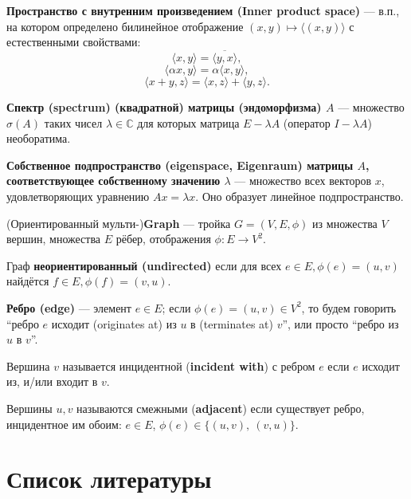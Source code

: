 \documentclass[14pt,a4paper]{extarticle}
\numberwithin{equation}{section}
\theoremstyle{definition}
\begin{document}
\textbf{Пространство с внутренним произведением (Inner product space)} --- в.п.,
на котором определено билинейное отображение \( (x,y) \mapsto \langle (x, y) \rangle\)
с естественными свойствами:
\[ \langle  x, y \rangle = \overline{\langle y, x \rangle}, \]
\[ \langle  \alpha x, y \rangle = \alpha \langle x, y \rangle, \]
\[ \langle  x + y, z \rangle =
  \langle x, z \rangle
  + \langle y, z \rangle.
\]

\textbf{Спектр (spectrum) (квадратной) матрицы (эндоморфизма) \( A \)} ---
множество \( \sigma(A) \) таких чисел \( \lambda\in\mathbb{C} \)
для которых матрица \( E - \lambda A \) (оператор \( I - \lambda A \))
необоратима.

\textbf{Собственное подпространство (eigenspace, Eigenraum)
  матрицы \( A \), соответствующее собственному значению \( \lambda \)}
--- множество всех векторов \( x \), удовлетворяющих уравнению \( Ax = \lambda
x\). Оно образует линейное подпространство.

(Ориентированный мульти-)\textbf{Graph} --- тройка \(G = (V, E, \phi)\)
из множества \( V \) вершин, множества \( E \) рёбер,
отображения \( \phi: E\to V^2\).

Граф \textbf{неориентированный (undirected)} если для всех \( e\in E, \phi(e)=(u, v)\)
найдётся \( f\in E, \phi(f)=(v, u) \).

\textbf{Ребро (edge)} --- элемент \( e\in E \); если \( \phi(e) = (u, v)\in V^2 \),
то будем говорить ``ребро \( e \) исходит (originates at) из \( u \) в
(terminates at) \( v \)'', или просто ``ребро из \( u \) в \( v \)''.

Вершина \( v \) называется инцидентной (\textbf{incident with}) с ребром \( e \)
если \( e \) исходит из, и/или входит в \( v \).

Вершины \( u, v\) называются смежными (\textbf{adjacent})
если существует ребро, инцидентное им обоим: \( e\in E \),
\( \phi(e)\in\{(u, v),\ (v, u) \}\).
\newpage
\section{Список литературы}
\nocite{*}
\printbibliography[heading=none,env=gostbibliography]
\end{document}
